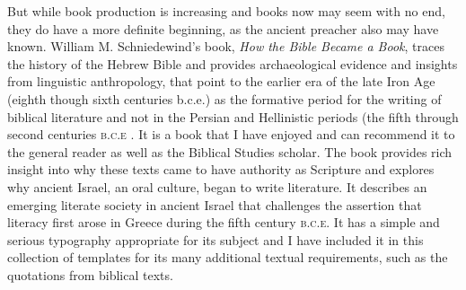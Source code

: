 But while book production is increasing and books now may seem with no end, they do have a more definite beginning, as the ancient preacher also may have known. William M. Schniedewind’s book, \emph{How the Bible Became a Book}, traces the history of the Hebrew Bible and provides archaeological evidence and insights from linguistic anthropology,
that point to the earlier era of the late Iron Age (eighth
though sixth centuries b.c.e.) as the formative period for the writing
of biblical literature and not in the Persian and Hellinistic periods (the fifth through second centuries \textsc{b.c.e} 
\citep{schniedewind2005}. It is a book that I have enjoyed and can recommend it to the general reader as well as the Biblical Studies scholar. The book  provides rich insight into why these
texts came to have authority as Scripture and explores why ancient
Israel, an oral culture, began to write literature. It describes an emerging
literate society in ancient Israel that challenges the assertion that
literacy first arose in Greece during the fifth century \textsc{b.c.e.} It has a simple and serious
typography appropriate for its subject and I have included it in this collection of templates for its many additional textual requirements, such as the quotations from biblical texts.

